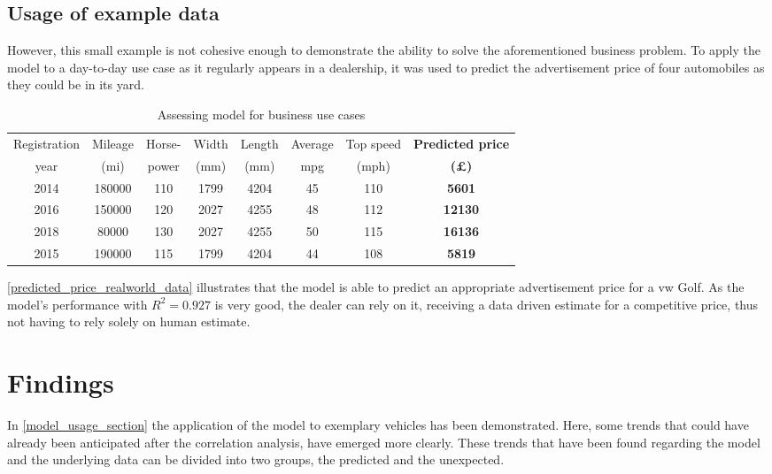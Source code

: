 \subsection{Usage of example data}
However, this small example is not cohesive enough to demonstrate the ability to solve the aforementioned business problem.
To apply the model to a day-to-day use case as it regularly appears in a dealership, it was used to predict the advertisement price
of four automobiles as they could be in its yard.
\begin{table}[H]
    \begin{adjustbox}{width={\textwidth}}
        \begin{tabular}{|c|c|c|c|c|c|c|c|}
            \hline
            Registration & Mileage & Horse- & Width & Length & Average & Top speed & \textbf{Predicted price} \\[-1ex]
            year         & (mi)    & power  & (mm)  & (mm)   & mpg     & (mph)     & \textbf{(£)}             \\ \hline
            2014         & 180000  & 110    & 1799  & 4204   & 45      & 110       & \textbf{5601}            \\\hline
            2016         & 150000  & 120    & 2027  & 4255   & 48      & 112       & \textbf{12130}           \\\hline
            2018         & 80000   & 130    & 2027  & 4255   & 50      & 115       & \textbf{16136}           \\\hline
            2015         & 190000  & 115    & 1799  & 4204   & 44      & 108       & \textbf{5819}            \\ \hline
        \end{tabular}
    \end{adjustbox}
    \caption{Assessing model for business use cases}
    \label{predicted_price_realworld_data}
\end{table}
\autoref{predicted_price_realworld_data} illustrates that the model is able to predict an appropriate advertisement price
for a \ac{vw} Golf. As the model's performance with $R^2 = 0.927$ is very good, the dealer can rely on it, receiving a data driven
estimate for a competitive price, thus not having to rely solely on human estimate.
\section{Findings}
In \autoref{model_usage_section} the application of the model to exemplary vehicles has been demonstrated. %
Here, some trends that could have already been anticipated after the correlation analysis, have emerged more clearly.
\newline
These trends that have been found regarding the model and the underlying data can be divided into two groups, the predicted and the unexpected.
